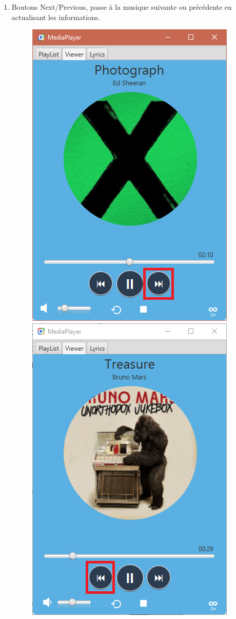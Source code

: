 \documentclass[a4paper,12pt]{report} %
\begin{document}
\begin{enumerate}
\begin{figure}[ht]
			\end{figure}
		
		\newpage
   		\item Boutons Next/Previous, passe à la musique suivante ou précédente en actualisant les informations.
   			\begin{figure}[ht] 		
				\centering
  				\includegraphics[scale=0.6]{next}
  				\hspace{5mm}
  				\includegraphics[scale=0.6]{prec}
			\end{figure}			 
		

\end{enumerate}
\end{document}
